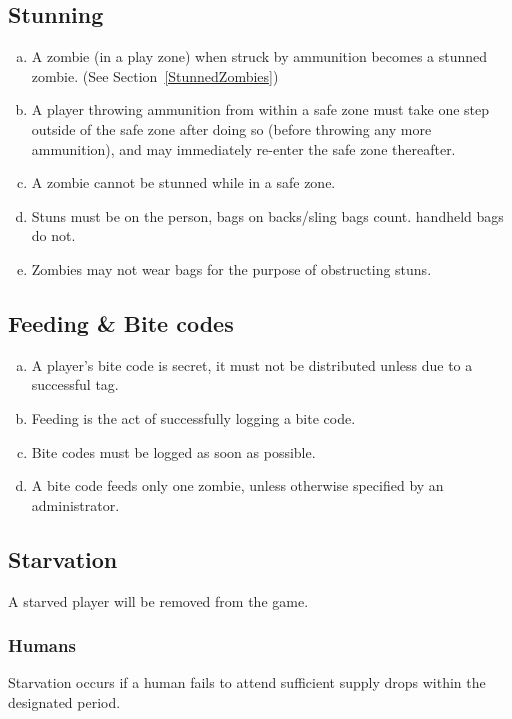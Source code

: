 \documentclass[a4paper,12pt]{article}
\begin{document}
\subsection{Stunning}

\begin{enumerate}[(a)]
    \item A zombie (in a play zone) when struck by ammunition becomes a stunned zombie. (See Section~\ref{StunnedZombies})
    \item A player throwing ammunition from within a safe zone must take one step outside of the safe zone after doing so (before throwing any more ammunition), and may immediately re-enter the safe zone thereafter.
    \item A zombie cannot be stunned while in a safe zone.
    \item Stuns must be on the person, bags on backs/sling bags count. handheld bags do not.
    \item Zombies may not wear bags for the purpose of obstructing stuns.
\end{enumerate}

\subsection{Feeding \& Bite codes}

\begin{enumerate}[(a)]
    \item A player's bite code is secret, it must not be distributed unless due to a successful tag.
    \item Feeding is the act of successfully logging a bite code.
    \item Bite codes must be logged as soon as possible.
    \item A bite code feeds only one zombie, unless otherwise specified by an administrator.
\end{enumerate}

\subsection{Starvation}
A starved player will be removed from the game.
    \subsubsection{Humans}
    Starvation occurs if a human fails to attend sufficient supply drops within the designated period.
\end{document}
